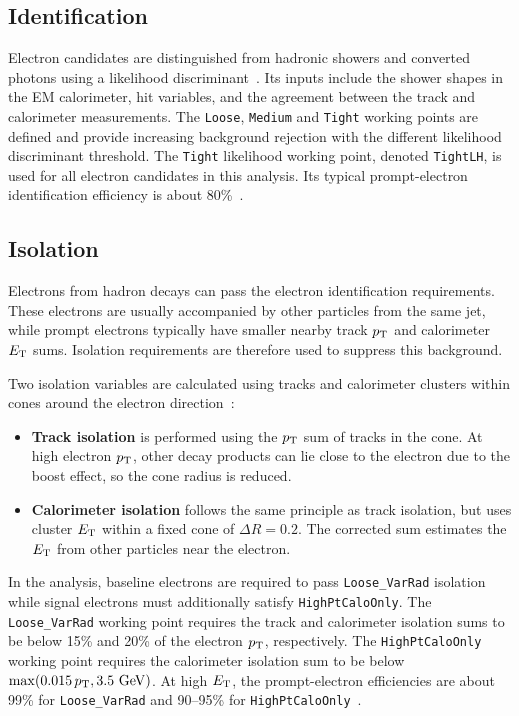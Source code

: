 \subsection{Identification}

Electron candidates are distinguished from hadronic showers and converted photons using a likelihood discriminant~\cite{ATLAS2019ElectronReco}.
Its inputs include the shower shapes in the EM calorimeter, hit variables, and the agreement between the track and calorimeter measurements.
The \texttt{Loose}, \texttt{Medium} and \texttt{Tight} working points are defined and provide increasing background rejection with the different likelihood discriminant threshold.
The \texttt{Tight} likelihood working point, denoted \texttt{TightLH}, is used for all electron candidates in this analysis.
Its typical prompt-electron identification efficiency is about 80\%~\cite{ATLAS2024ElectronPhotonEfficiencies}.

\subsection{Isolation}

Electrons from hadron decays can pass the electron identification requirements.
These electrons are usually accompanied by other particles from the same jet, while prompt electrons typically have smaller nearby track $p_{\mathrm{T}}$ and calorimeter $E_{\mathrm{T}}$ sums.
Isolation requirements are therefore used to suppress this background.

Two isolation variables are calculated using tracks and calorimeter clusters within cones around the electron direction~\cite{ATLAS2019ElectronPerformance}:
\begin{itemize}
    \item \textbf{Track isolation} is performed using the $p_{\mathrm{T}}$ sum of tracks in the cone. At high electron $p_{\mathrm{T}}$, other decay products can lie close to the electron due to the boost effect, so the cone radius is reduced.
    \item \textbf{Calorimeter isolation} follows the same principle as track isolation, but uses cluster $E_{\mathrm{T}}$ within a fixed cone of $\Delta R=0.2$. The corrected sum estimates the $E_{\mathrm{T}}$ from other particles near the electron.
\end{itemize}
In the analysis, baseline electrons are required to pass \texttt{Loose\_VarRad} isolation while signal electrons must additionally satisfy \texttt{HighPtCaloOnly}.
The \texttt{Loose\_VarRad} working point requires the track and calorimeter isolation sums to be below 15\% and 20\% of the electron $p_{\mathrm{T}}$, respectively.
The \texttt{HighPtCaloOnly} working point requires the calorimeter isolation sum to be below $\max(0.015\,p_{\mathrm{T}},3.5~\mathrm{GeV})$.
At high $E_{\mathrm{T}}$, the prompt-electron efficiencies are about 99\% for \texttt{Loose\_VarRad} and 90--95\% for \texttt{HighPtCaloOnly}~\cite{ATLAS2024ElectronPhotonEfficiencies}.

